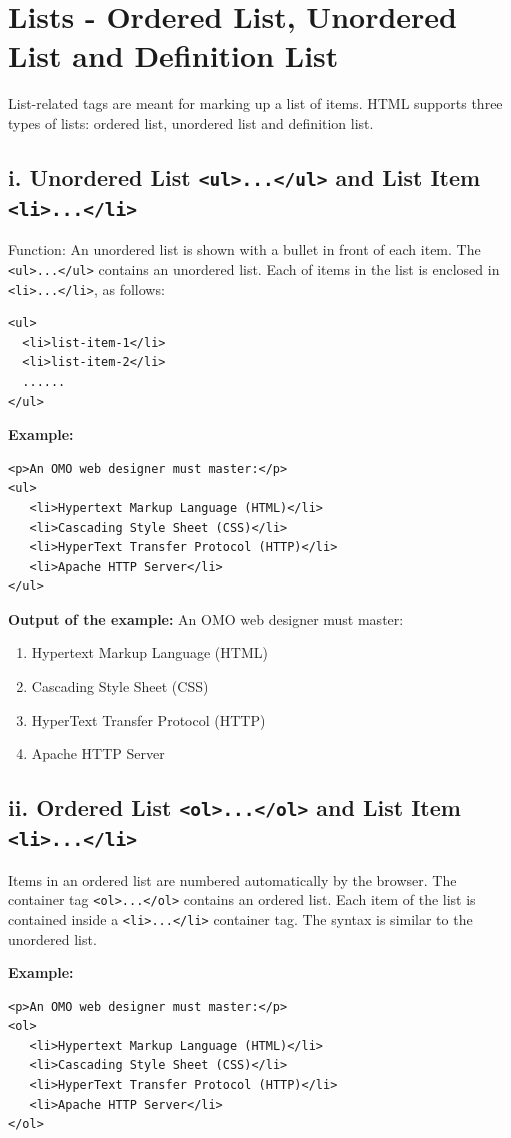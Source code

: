 \documentclass[12pt,a4paper]{article}
\begin{document}
\section*{Lists - Ordered List, Unordered List and Definition List}
List-related tags are meant for marking up a list of items. HTML supports three types of lists: ordered list, unordered list and definition list.

\subsection*{i. Unordered List \texttt{<ul>...</ul>} and List Item \texttt{<li>...</li>}}
Function: An unordered list is shown with a bullet in front of each item. The \texttt{<ul>...</ul>} contains an unordered list. Each of items in the list is enclosed in \texttt{<li>...</li>}, as follows:

\begin{verbatim}
<ul>
  <li>list-item-1</li>
  <li>list-item-2</li>
  ......
</ul>
\end{verbatim}

\textbf{Example:}
\begin{verbatim}
<p>An OMO web designer must master:</p>
<ul>
   <li>Hypertext Markup Language (HTML)</li>
   <li>Cascading Style Sheet (CSS)</li>
   <li>HyperText Transfer Protocol (HTTP)</li>
   <li>Apache HTTP Server</li>
</ul>
\end{verbatim}

\textbf{Output of the example:}
An OMO web designer must master:
\begin{enumerate}
    \item Hypertext Markup Language (HTML)
    \item Cascading Style Sheet (CSS)
    \item HyperText Transfer Protocol (HTTP)
    \item Apache HTTP Server
\end{enumerate}

\subsection*{ii. Ordered List \texttt{<ol>...</ol>} and List Item \texttt{<li>...</li>}}
Items in an ordered list are numbered automatically by the browser. The container tag \texttt{<ol>...</ol>} contains an ordered list. Each item of the list is contained inside a \texttt{<li>...</li>} container tag. The syntax is similar to the unordered list.

\textbf{Example:}
\begin{verbatim}
<p>An OMO web designer must master:</p>
<ol>
   <li>Hypertext Markup Language (HTML)</li>
   <li>Cascading Style Sheet (CSS)</li>
   <li>HyperText Transfer Protocol (HTTP)</li>
   <li>Apache HTTP Server</li>
</ol>
\end{verbatim}
\end{document}
